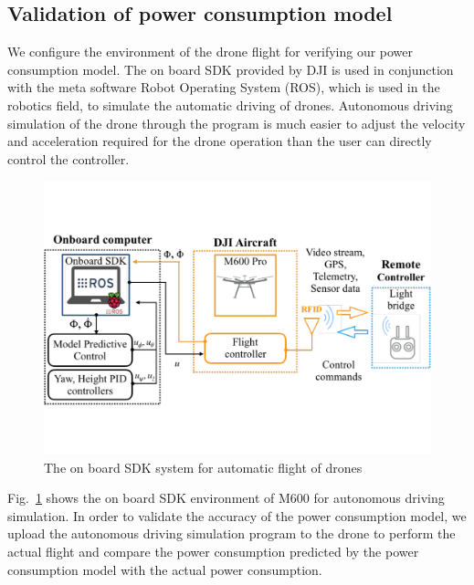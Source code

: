 \documentclass[journal]{./template/IEEEtran}
\begin{document}
\label{Section: Deep Neural networks (DNN)}





\subsection{Validation of power consumption model}

We configure the environment of the drone flight for verifying our power consumption model. 
The on board SDK provided by DJI is used in conjunction with the meta software Robot Operating System (ROS), which is used in the robotics field, to simulate the automatic driving of drones. 
Autonomous driving simulation of the drone through the program is much easier to adjust the velocity and acceleration required for the drone operation than the user can directly control the controller. 

\begin{figure}[htbp]
\centering\includegraphics[scale=0.285]{fig7/SDK.pdf}
\caption{The on board SDK system for automatic flight of drones}
\label{fig:SDK}
\end{figure}

Fig.~\ref{fig:SDK} shows the on board SDK environment of M600 for autonomous driving simulation.
In order to validate the accuracy of the power consumption model, we upload the autonomous driving simulation program to the drone to perform the actual flight and compare the power consumption predicted by the power consumption model with the actual power consumption. 
\end{document}
